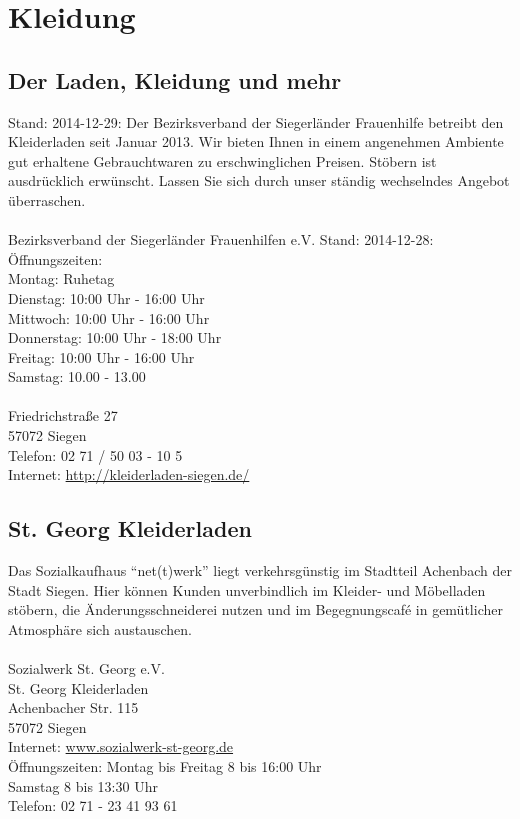 \chapter{Kleidung}

\section{Der Laden, Kleidung und mehr}
Stand: 2014-12-29: Der Bezirksverband der Siegerländer Frauenhilfe betreibt den Kleiderladen seit Januar 2013. Wir bieten Ihnen in einem angenehmen Ambiente gut erhaltene Gebrauchtwaren zu erschwinglichen Preisen. Stöbern ist ausdrücklich erwünscht. Lassen Sie sich durch unser ständig wechselndes Angebot überraschen.\\
\\
Bezirksverband der Siegerländer Frauenhilfen e.V. 
Stand: 2014-12-28: Öffnungszeiten: \\
Montag: Ruhetag\\
Dienstag: 10:00 Uhr - 16:00 Uhr\\
Mittwoch: 10:00 Uhr - 16:00 Uhr\\
Donnerstag: 10:00 Uhr - 18:00 Uhr\\
Freitag: 10:00 Uhr - 16:00 Uhr\\
Samstag: 10.00 - 13.00\\
\\
Friedrichstraße 27\\
57072 Siegen\\
Telefon: 02 71 / 50 03 - 10 5\\
Internet: \href{http://kleiderladen-siegen.de/}{http://kleiderladen-siegen.de/}

\section{St. Georg Kleiderladen}
Das Sozialkaufhaus \enquote{net(t)werk} liegt verkehrsgünstig im Stadtteil Achenbach der Stadt Siegen. Hier können Kunden unverbindlich im Kleider- und Möbelladen stöbern, die Änderungsschneiderei nutzen und im Begegnungscafé in gemütlicher Atmosphäre sich austauschen.\\
\\
Sozialwerk St. Georg e.V. \\
St. Georg Kleiderladen \\
Achenbacher Str. 115 \\
57072 Siegen \\
Internet: \href{http://www.sozialwerk-st-georg.de}{www.sozialwerk-st-georg.de}
\\
Öffnungszeiten: Montag bis Freitag 8 bis 16:00 Uhr\\
Samstag 8 bis 13:30 Uhr \\
Telefon: 02 71 - 23 41 93 61\\ 


